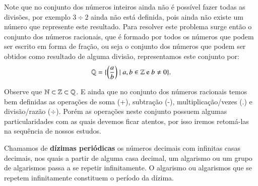 Note que no conjunto dos números inteiros ainda não é possível fazer todas as divisões, por exemplo $3 \div 2$ ainda não está definida, pois ainda não existe um número que represente este resultado. Para resolver este problema surge então o conjunto dos números racionais, que é formado por todos os números que podem ser escrito em forma de fração, ou seja o conjunto dos números que podem ser obtidos como resultado de alguma divisão, representamos este conjunto por:
\[\mathbb{Q}= \{ \left(\frac{a}{b}\right) \mid a, b \in \mathbb{Z} \text{ e } b \neq 0 \}.\]

Observe que $\mathbb{N} \subset \mathbb{Z} \subset \mathbb{Q}$. E ainda que no conjunto dos números racionais temos bem definidas as operações de soma (+), subtração (-), multiplicação/vezes (.) e divisão/razão ($\div$). Porém as operações neste conjunto possuem algumas particularidades com as quais devemos ficar atentos, por isso iremos retomá-las na sequência de nossos estudos.

 \vskip0.3cm
 \colorbox{azul}{
 \begin{minipage}{14.5cm}
 \begin{center}
  Chamamos de \textbf{dízimas periódicas} os números decimais com infinitas casas decimais, nos quais a partir de alguma casa decimal, um algarismo ou um grupo de algarismos passa a se repetir infinitamente. O algarismo ou algarismos que se repetem infinitamente constituem o período da dízima.
 \end{center}
 \end{minipage}}
 \vskip0.3cm

